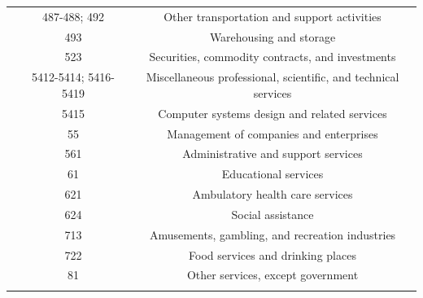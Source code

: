 \documentclass[dv_diss_main.tex]{subfiles}
\begin{document}
\begin{table}[H]
\begin{center}
{\begin{tabular}{ccc}
& 487-488; 492 & Other transportation and support activities \\ 
& 493 & Warehousing and storage \\ 
& 523 & Securities, commodity contracts, and investments \\
& 5412-5414; 5416-5419 & Miscellaneous professional, scientific, and technical services \\
& 5415 & Computer systems design and related services \\ 
& 55 & Management of companies and enterprises \\ 
& 561 & Administrative and support services \\ 
& 61 & Educational services \\
& 621 & Ambulatory health care services \\ 
& 624 & Social assistance \\ 
& 713 & Amusements, gambling, and recreation industries \\ 
& 722 & Food services and drinking places \\
& 81 & Other services, except government \\ 
\vspace{-3pt} & \vspace{-3pt} \\ \hline
\end{tabular}
}
\end{center}
\end{table}
\end{document}
